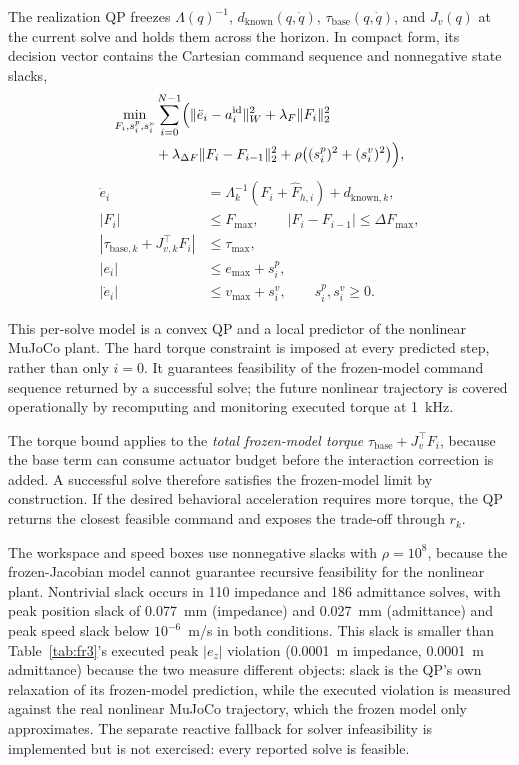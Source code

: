 \documentclass[journal]{IEEEtran}
\begin{document}
The realization QP freezes $\Lambda(q)^{-1}$, $d_{\mathrm{known}}(q,\dot q)$,
$\tau_{\mathrm{base}}(q,\dot q)$, and $J_v(q)$ at the current solve and
holds them across the horizon. In compact form, its decision vector
contains the Cartesian command sequence and nonnegative state slacks,
\begin{equation}
\begin{aligned}
\min_{F_i,s^p_i,s^v_i} & \sum_{i=0}^{N-1} \Bigl(
\|\ddot e_i-a_i^{\mathrm{id}}\|_W^2+\lambda_F\|F_i\|_2^2\\
&+\lambda_{\Delta F}\|F_i-F_{i-1}\|_2^2
+\rho\bigl((s^p_i)^2+(s^v_i)^2\bigr) \Bigr),
\end{aligned}
\end{equation}
\begin{equation}
\begin{aligned}
\ddot e_i&=\Lambda_k^{-1}(F_i+\hat F_{h,i})+d_{\mathrm{known},k},\\
|F_i|&\le F_{\max},\qquad |F_i-F_{i-1}|\le\Delta F_{\max},\\
|\tau_{\mathrm{base},k}+J_{v,k}^{\top}F_i|&\le\tau_{\max},\\
|e_i|&\le e_{\max}+s^p_i,\\
|\dot e_i|&\le v_{\max}+s^v_i,\qquad s^p_i,s^v_i\ge0.
\end{aligned}
\end{equation}

This per-solve model is a convex QP and a local predictor of the
nonlinear MuJoCo plant. The hard torque constraint is imposed at every
predicted step, rather than only $i=0$. It guarantees feasibility of the
frozen-model command sequence returned by a successful solve; the future
nonlinear trajectory is covered operationally by recomputing and
monitoring executed torque at 1~kHz.

The torque bound applies to the \emph{total frozen-model torque}
$\tau_{\mathrm{base}}+J_v^\top F_i$, because the base term can consume
actuator budget before the interaction correction is added. A successful
solve therefore satisfies the frozen-model limit by construction. If the
desired behavioral acceleration requires more torque, the QP returns the
closest feasible command and exposes the trade-off through $r_k$.

The workspace and speed boxes use nonnegative slacks with $\rho=10^8$,
because the frozen-Jacobian model cannot guarantee recursive feasibility
for the nonlinear plant. Nontrivial slack occurs in 110 impedance and
186 admittance solves, with peak position slack of 0.077~mm (impedance)
and 0.027~mm (admittance) and peak speed slack below $10^{-6}$~m/s in
both conditions. This slack is smaller than Table~\ref{tab:fr3}'s
executed peak $|e_z|$ violation (0.0001~m impedance, 0.0001~m
admittance) because the two measure different objects: slack is the
QP's own relaxation of its frozen-model prediction, while the executed
violation is measured against the real nonlinear MuJoCo trajectory,
which the frozen model only approximates. The separate reactive
fallback for solver infeasibility is implemented but is not exercised:
every reported solve is feasible.
\end{document}
